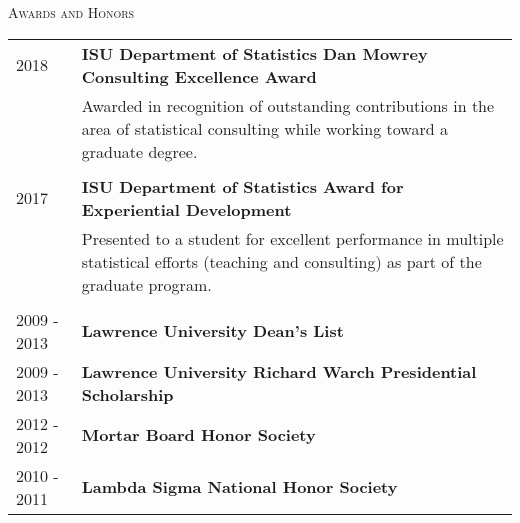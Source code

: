 \documentclass[10pt, oneside]{article}
\begin{document}
\noindent \textsc{Awards and Honors} \hrulefill
\begin{longtable}{p{2.25cm}p{14cm}}
\hfill{2018} & \textbf{ISU Department of Statistics Dan Mowrey Consulting Excellence Award}\\
& Awarded in recognition of outstanding contributions in the area of statistical consulting while working toward a graduate degree.\\
\\
\hfill{2017} & \textbf{ISU Department of Statistics Award for Experiential Development}\\
& Presented to a student for excellent performance in multiple statistical efforts (teaching and consulting) as part of the graduate program.\\
\\
\hfill{2009 - 2013} & \textbf{Lawrence University Dean’s List}\\
\hfill{2009 - 2013} & \textbf{Lawrence University Richard Warch Presidential Scholarship}\\
\hfill{2012 - 2012} & \textbf{Mortar Board Honor Society}\\
\hfill{2010 - 2011} & \textbf{Lambda Sigma National Honor Society}
\end{longtable}
\end{document}

